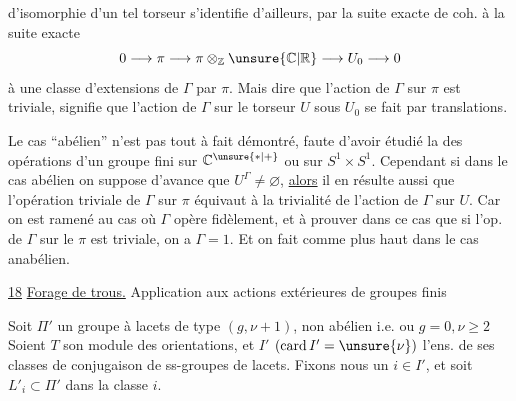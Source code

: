 
d'isomorphie d'un tel torseur s'identifie d'ailleurs, par la suite exacte de coh.  à la suite exacte
\[
0 \longrightarrow \pi \longrightarrow
\pi\otimes_{\mathbb Z}\unsure{\mathbb C|\mathbb R}
\longrightarrow U_0 \longrightarrow 0
\]
à une classe d'extensions de \(\Gamma\) par \(\pi\).
Mais dire que l'action de \(\Gamma\) sur \(\pi\) est triviale, signifie que l'action de \(\Gamma\) sur le torseur \(U\) sous \(U_0\) se fait par translations.

\uline{} Le cas ``abélien'' n'est pas tout à fait démontré, faute d'avoir étudié la    des opérations d'un groupe fini sur \(\mathbb C^{\unsure{*|+}}\) ou sur \(S^1\times S^1\). Cependant si dans le cas abélien on suppose d'avance que \(U^\Gamma\ne\varnothing\), \uline{alors}  il en résulte aussi que l'opération triviale de \(\Gamma\) sur \(\pi\) équivaut à la trivialité de l'action de \(\Gamma\) sur \(U\). Car on est ramené au cas où \(\Gamma\) opère fidèlement, et à prouver dans ce cas que si l'op. de \(\Gamma\) sur le \(\pi\) est triviale, on a \(\Gamma=1\). Et on fait comme plus haut dans le cas anabélien.


\uline{18} \uline{Forage de trous.} Application aux actions extérieures de groupes finis

Soit \(\Pi'\) un groupe à lacets de type \((g,\nu+1)\), non abélien i.e.   ou \(g=0,\nu\ge2\)
Soient \(T\) son module des orientations, et \(I'\) \((\operatorname{card}I'=\unsure{\nu})\) l'ens. de ses classes de conjugaison de ss-groupes de lacets. Fixons nous un \(i\in I'\), et soit \(L'_i\subset\Pi'\) dans la classe \(i\).

